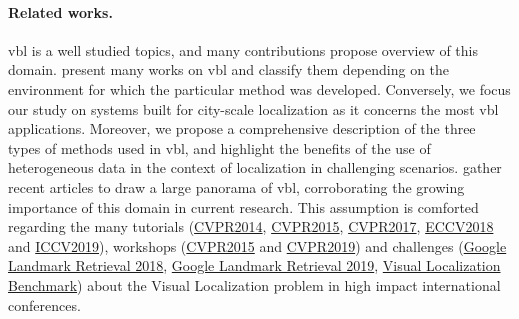 	\paragraph{Related works.} 
    	\ac{vbl} is a well studied topics, and many contributions propose overview of this domain. \citet{Brejcha2017} present many works on \ac{vbl} and classify them depending on the environment for which the particular method was developed. Conversely, we focus our study on systems built for city-scale localization as it concerns the most \ac{vbl} applications. Moreover, we propose a comprehensive description of the three types of methods used in \ac{vbl}, and highlight the benefits of the use of heterogeneous data in the context of localization in challenging scenarios. \citet{Zamir2016} gather recent articles to draw a large panorama of \ac{vbl}, corroborating the growing importance of this domain in current research. This assumption is comforted regarding the many tutorials (\href{https://sites.google.com/site/lsvpr2014/}{CVPR2014}, \href{https://roboticvision.atlassian.net/wiki/display/PUB/CVPR+2015+Workshop+on+Visual+Place+Recognition+in+Changing+Environments}{CVPR2015}, \href{https://sites.google.com/view/lsvpr2017/home}{CVPR2017}, \href{https://sites.google.com/view/visual-localization-eccv-2018/home}{ECCV2018} and \href{https://sites.google.com/view/lsvpr2019}{ICCV2019}), workshops (\href{https://roboticvision.atlassian.net/wiki/display/PUB/CVPR+2015+Workshop+on+Visual+Place+Recognition+in+Changing+Environments}{CVPR2015} and \href{https://sites.google.com/view/ltvl2019}{CVPR2019}) and challenges (\href{https://www.kaggle.com/c/landmark-retrieval-challenge}{Google Landmark Retrieval 2018}, \href{https://www.kaggle.com/c/landmark-retrieval-2019}{Google Landmark Retrieval 2019}, \href{https://www.visuallocalization.net/}{Visual Localization Benchmark}) about the Visual Localization problem in high impact international conferences.
    	
